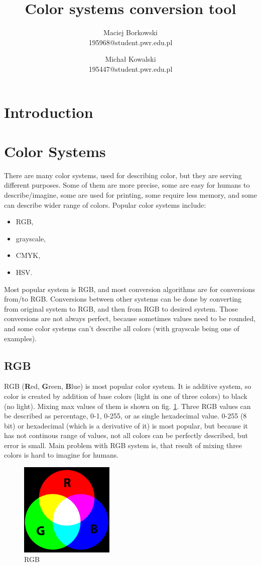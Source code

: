 \documentclass[titlepage]{article}
\title{Color systems conversion tool}
\author{Maciej Borkowski\\ 195968@student.pwr.edu.pl \and Michał Kowalski \\ 195447@student.pwr.edu.pl}
\date{}
\begin{document}
\maketitle
\section{Introduction}

\section{Color Systems}
There are many color systems, used for describing color, but they are serving
different purposes. Some of them are more precise, some are easy for humans to
describe/imagine, some are used for printing, some require less memory, and some
can describe wider range of colors.
Popular color systems include:
\begin{itemize}
  \item RGB,
  \item grayscale,
  \item CMYK,
  \item HSV.
\end{itemize}
Most popular system is RGB, and most conversion algorithms are for conversions
from/to RGB. Conversions between other systems can be done by converting from
original system to RGB, and then from RGB to desired system. Those conversions
are not always perfect, because sometimes values need to be rounded, and some
color systems can't describe all colors (with grayscale being one of examples).

\subsection{RGB}
RGB (\textbf{R}ed, \textbf{G}reen, \textbf{B}lue) is most popular color system.
It is additive system, so color is created by addition of base colors (light in
one of three colors) to black (no light). Mixing max values of them is shown on
fig. \ref{fig:rgb}. Three RGB values can be described as percentage, 0-1, 0-255,
or as single hexadecimal value. 0-255 (8 bit) or hexadecimal (which is a
derivative of it) is most popular, but because it has not continous range of
values, not all colors can be perfectly described, but error is small. Main
problem with RGB system is, that result of mixing three colors is hard to
imagine for humans.

\begin{figure}[!htb]
	\centering
	\includegraphics[width=0.4\textwidth]{img/RGB.png}
	\caption{RGB} 
	\label{fig:rgb}
\end{figure}
\end{document}
